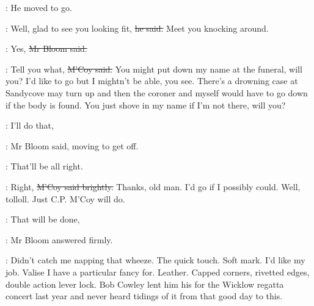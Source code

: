 :
He moved to go.

\mccoy:
Well, glad to see you looking fit,
\sout{he said.}
Meet you knocking around.

\Bloom:
Yes,
\sout{Mr Bloom said.}

\mccoy:
Tell you what,
\sout{M'Coy said.}
You might put down my name at the funeral,
will you?
I'd like to go but I mightn't be able, you see.
There's a drowning case at Sandycove may turn up
and then the coroner and myself would have to go down
if the body is found.
You just shove in my name if I'm not there,
will you?

\Bloom:
I'll do that,

:
Mr Bloom said,
moving to get off.

\Bloom:
That'll be all right.

\mccoy:
Right,
\sout{M'Coy said brightly.}
Thanks, old man.
I'd go if I possibly could.
Well, tolloll.
Just C.P. M'Coy will do.

\Bloom:
That will be done,

:
Mr Bloom answered firmly.

\BloomInt:
Didn't catch me napping that wheeze.
The quick touch.
Soft mark.
I'd like my job.
Valise I have a particular fancy for.
Leather.
Capped corners,
rivetted edges,
double action lever lock.
Bob Cowley lent him his for the Wicklow regatta concert last year
and never heard tidings of it from that good day to this.
